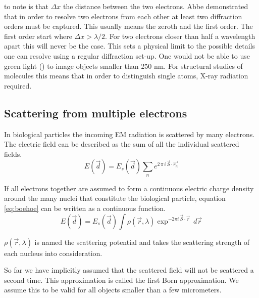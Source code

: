 \DIFaddend 

\DIFdelbegin {}\DIFdelend \DIFaddbegin {}\DIFaddend to note is that $\Delta x $ \DIFdelbegin {}\DIFdelend \DIFaddbegin {}\DIFaddend the
distance between the two electrons\DIFdelbegin {}\DIFdelend . Abbe demonstrated that in order to
resolve two electrons from each other at least two diffraction orders
must be captured. This usually means the zeroth and the first
order. The first order start where $\Delta x > \lambda/2$. For two
electrons closer than half a wavelength apart this will never be the
case. This sets a physical limit to the possible details one can
resolve using a regular diffraction set-up. One would not be able to
use green light (\DIFdelbegin {}\DIFdelend \DIFaddbegin {}\DIFaddend ) to image objects smaller than 250
nm. For structural studies of molecules this means that in order to
distinguish single atoms, X-ray radiation \DIFdelbegin {}\DIFdelend \DIFaddbegin {}\DIFaddend required.


\subsection{Scattering from multiple electrons}
In biological particles the incoming EM radiation is scattered by many
electrons. The electric field can be described as the sum of all the
individual scattered fields.
\begin{equation}\label{eq:boehoe}
E(\vec{d}) = E_s(\vec{d}) \sum_{n} e^{2\,\pi\,  i\,\vec{S}\cdot\vec{r_n}}
\end{equation}
\DIFaddbegin {}\DIFaddend 

If all electrons together are assumed to form a continuous electric
charge density around the many nuclei that constitute the biological
particle, equation \ref{eq:boehoe} can be written as a continuous
function.
\begin{equation}\label{eq:cont}
E(\vec{d}) = E_s(\vec{d})\int \rho(\vec{r},\lambda) \exp^{-2\pi i \,\vec{S} \cdot \vec{r}}\,d\vec{r}
\end{equation}

$\rho(\vec{r},\lambda)$ is named the scattering potential and takes
the scattering strength of each nucleus into consideration.

So far we have implicitly assumed that the scattered field will not be
scattered a second time. This approximation is called the first Born
approximation. We assume this to be valid for all objects smaller than
a few micrometers.

